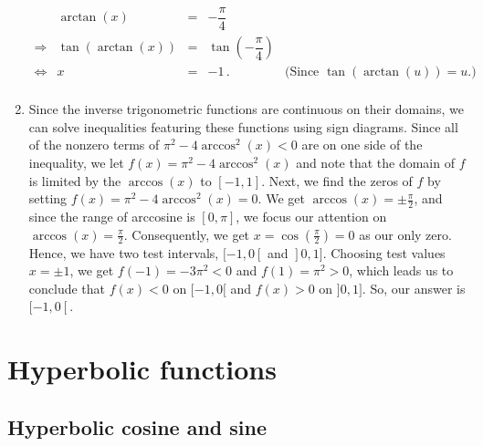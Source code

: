 \begin{example}
\begin{enumerate}
\[\begin{array}{rrclr}
		&\arctan(x) & = & -\dfrac{\pi}{4} & \\ [5pt]
		\Rightarrow&\tan(\arctan(x)) & = & \tan\left(-\dfrac{\pi}{4}\right) & \\ [5pt]
		\Leftrightarrow&x & = & -1\,. & \text{(Since $\tan(\arctan(u)) = u$.)} \\ \end{array}\]
		\renewcommand{\arraystretch}{1}%
		\item Since the inverse trigonometric functions are continuous on their domains, we can solve inequalities featuring these functions using sign diagrams. Since all of the nonzero terms of  $\pi^2-4\arccos^{2}(x) < 0$ are on one side of the inequality, we let $f(x) = \pi^2-4\arccos^{2}(x)$ and note that the domain of $f$ is limited by the $\arccos(x)$ to $[-1,1]$.  Next, we find the zeros of $f$ by setting $f(x) = \pi^2-4\arccos^{2}(x) = 0$.  We get $\arccos(x) = \pm \frac{\pi}{2}$, and since the range of arccosine is $[0,\pi]$, we focus our attention on $\arccos(x) = \frac{\pi}{2}$.  Consequently, we get $x = \cos\left(\frac{\pi}{2}\right) = 0$ as our only zero.  Hence, we have two test intervals, $[-1,0\left[\right.$ and $\left.\right]0,1]$.  Choosing test values $x = \pm 1$, we get $f(-1) = -3\pi^2 < 0$ and $f(1) = \pi^2 > 0$, which leads us to conclude that $f(x)<0$ on $[-1,0[$ and $f(x)>0$ on $]0,1]$. So, our answer is $[-1,0\left[\right.$.  
		
		
	\end{enumerate}
\end{example}
\fi



\ifcourse
\ifanalysis


\section{Hyperbolic functions}\label{hyp_functies}
\subsection{Hyperbolic cosine and sine}
\ifcourse
	\checkoddpage
{}
 \fi

